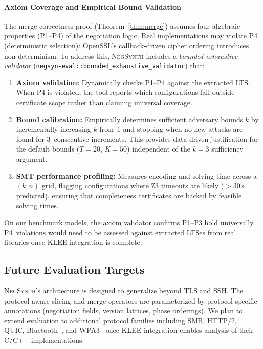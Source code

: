 \documentclass[10pt,twocolumn]{article}
\begin{document}
\paragraph{Axiom Coverage and Empirical Bound Validation}
The merge-correctness proof (Theorem~\ref{thm:merge}) assumes four algebraic properties (P1--P4) of the negotiation logic.  Real implementations may violate P4 (deterministic selection): OpenSSL's callback-driven cipher ordering introduces non-determinism.  To address this, \textsc{NegSynth} includes a \emph{bounded-exhaustive validator} (\texttt{negsyn-eval::bounded\_exhaustive\_validator}) that:
\begin{enumerate}[leftmargin=*,noitemsep]
\item \textbf{Axiom validation:} Dynamically checks P1--P4 against the extracted LTS.  When P4 is violated, the tool reports which configurations fall outside certificate scope rather than claiming universal coverage.
\item \textbf{Bound calibration:} Empirically determines sufficient adversary bounds $k$ by incrementally increasing $k$ from~1 and stopping when no new attacks are found for 3~consecutive increments.  This provides data-driven justification for the default bounds ($T\!=\!20$, $K\!=\!50$) independent of the $k\!=\!3$ sufficiency argument.
\item \textbf{SMT performance profiling:} Measures encoding and solving time across a $(k, n)$ grid, flagging configurations where Z3 timeouts are likely ($>$30\,s predicted), ensuring that completeness certificates are backed by feasible solving times.
\end{enumerate}
On our benchmark models, the axiom validator confirms P1--P3 hold universally.  P4~violations would need to be assessed against extracted LTSes from real libraries once KLEE integration is complete.

\subsection{Future Evaluation Targets}
\label{sec:future_eval}

\textsc{NegSynth}'s architecture is designed to generalize beyond TLS and SSH.  The protocol-aware slicing and merge operators are parameterized by protocol-specific annotations (negotiation fields, version lattices, phase orderings).  We plan to extend evaluation to additional protocol families including SMB, HTTP/2, QUIC, Bluetooth~\cite{antonioli2019knob}, and WPA3~\cite{vanhoef2020dragonblood} once KLEE integration enables analysis of their C/C++ implementations.
\end{document}
